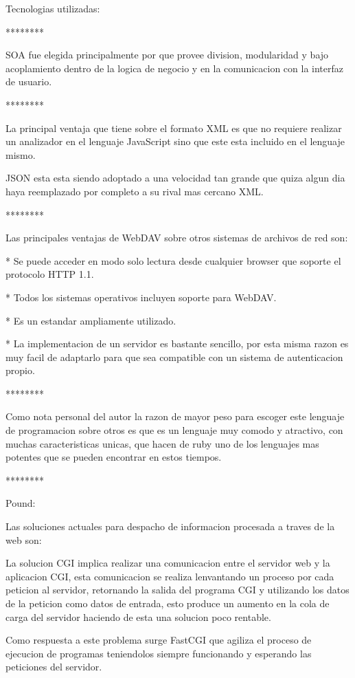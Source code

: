 Tecnologias utilizadas:

********

SOA fue elegida principalmente por que provee division, modularidad y bajo acoplamiento dentro de la logica de negocio y en la comunicacion con la interfaz de usuario.

********

La principal ventaja que tiene sobre el formato XML es que no requiere realizar un analizador en el lenguaje JavaScript sino que este esta incluido en el lenguaje mismo.

JSON esta esta siendo adoptado a una velocidad tan grande que quiza algun dia haya reemplazado por completo a su rival mas cercano XML.

********

Las principales ventajas de WebDAV sobre otros sistemas de archivos de red son:

* Se puede acceder en modo solo lectura desde cualquier browser que soporte el protocolo HTTP 1.1.

* Todos los sistemas operativos incluyen soporte para WebDAV.

* Es un estandar ampliamente utilizado.

* La implementacion de un servidor es bastante sencillo, por esta misma razon es muy facil de adaptarlo para que sea compatible con un sistema de autenticacion propio.

********

Como nota personal del autor la razon de mayor peso para escoger este lenguaje de programacion sobre otros es que es un lenguaje muy comodo y atractivo, con muchas caracteristicas unicas, que hacen de ruby uno de los lenguajes mas potentes que se pueden encontrar en estos tiempos.

********

Pound:

Las soluciones actuales para despacho de informacion procesada a traves de la web son:

La solucion CGI implica realizar una comunicacion entre el servidor web y la aplicacion CGI, esta comunicacion se realiza lenvantando un proceso por cada peticion al servidor, retornando la salida del programa CGI y utilizando los datos de la peticion como datos de entrada, esto produce un aumento en la cola de carga del servidor haciendo de esta una solucion poco rentable.

Como respuesta a este problema surge FastCGI que agiliza el proceso de ejecucion de programas teniendolos siempre funcionando y esperando las peticiones del servidor.

